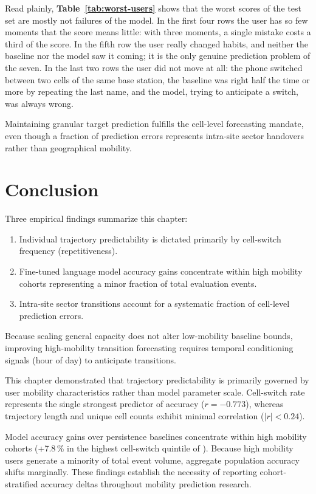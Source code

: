 

Read plainly, \textbf{Table~\ref{tab:worst-users}} shows that the worst scores of the test set are mostly not failures of the model. In the first four rows the user has so few moments that the score means little: with three moments, a single mistake costs a third of the score. In the fifth row the user really changed habits, and neither the baseline nor the model saw it coming; it is the only genuine prediction problem of the seven. In the last two rows the user did not move at all: the phone switched between two cells of the same base station, the baseline was right half the time or more by repeating the last name, and the model, trying to anticipate a switch, was always wrong.

Maintaining granular  target prediction fulfills the cell-level forecasting mandate, even though a fraction of prediction errors represents intra-site sector handovers rather than geographical mobility.

\section{Conclusion}
\label{sec:retro-user}

Three empirical findings summarize this chapter:
\begin{enumerate}
  \item Individual trajectory predictability is dictated primarily by cell-switch frequency (repetitiveness).
  \item Fine-tuned language model accuracy gains concentrate within high mobility cohorts representing a minor fraction of total evaluation events.
  \item Intra-site sector transitions account for a systematic fraction of cell-level prediction errors.
\end{enumerate}

Because scaling general capacity does not alter low-mobility baseline bounds, improving high-mobility transition forecasting requires temporal conditioning signals (hour of day) to anticipate transitions.

This chapter demonstrated that trajectory predictability is primarily governed by user mobility characteristics rather than model parameter scale. Cell-switch rate represents the single strongest predictor of accuracy ($r = -0.773$), whereas trajectory length and unique cell counts exhibit minimal correlation ($|r| < 0.24$).

Model accuracy gains over persistence baselines concentrate within high mobility cohorts (+7.8\,\% in the highest cell-switch quintile of \textbf{}). Because high mobility users generate a minority of total event volume, aggregate population accuracy shifts marginally. These findings establish the necessity of reporting cohort-stratified accuracy deltas throughout mobility prediction research.

